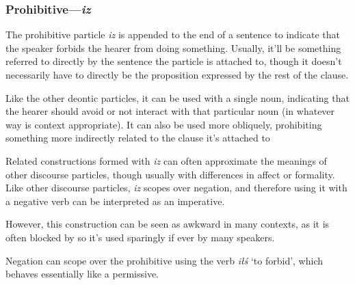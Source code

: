 \documentclass[a4paper,11pt,oneside,openany]{memoir}
\begin{document}
\subsubsection{Prohibitive---\textit{iz}}

The prohibitive particle \textit{iz} is appended to the end of a sentence to indicate that the speaker forbids the hearer from doing something. Usually, it'll be something referred to directly by the sentence the particle is attached to, though it doesn't necessarily have to directly be the proposition expressed by the rest of the clause.


Like the other deontic particles, it can be used with a single noun, indicating that the hearer should avoid or not interact with that particular noun (in whatever way is context appropriate). It can also be used more obliquely, prohibiting something more indirectly related to the clause it's attached to


Related constructions formed with \textit{iz} can often approximate the meanings of other discourse particles, though usually with differences in affect or formality. Like other discourse particles, \textit{iz} scopes over negation, and therefore using it with a negative verb can be interpreted as an imperative. 


However, this construction can be seen as awkward in many contexts, as it is often blocked by %
 so it's used sparingly if ever by many speakers.

Negation can scope over the prohibitive using the verb \textit{i\l\'s} `to forbid', which behaves essentially like a permissive.

\end{document}
